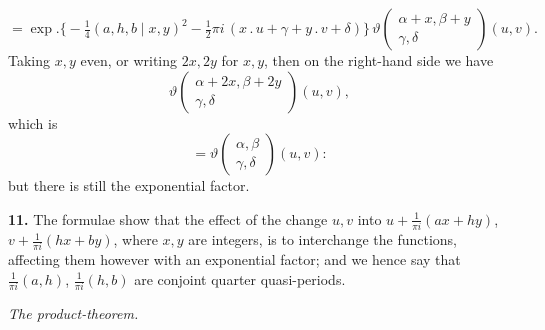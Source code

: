 \documentclass[11pt]{article}
\begin{document}
\[
= \exp.\bigl\{-\tfrac{1}{4}(a,h,b\mid x,y)^2 - \tfrac{1}{2}\pi i\,(x\mathbin{.}u + \gamma + y\mathbin{.}v + \delta)\bigr\}\,\vartheta\!\begin{pmatrix} \alpha + x,\beta + y \\ \gamma,\delta \end{pmatrix}\!(u,v).
\]
Taking $x,y$ even, or writing $2x, 2y$ for $x,y$, then on the right-hand side we have
\[
\vartheta\!\begin{pmatrix} \alpha + 2x,\beta + 2y \\ \gamma,\delta \end{pmatrix}\!(u,v),
\]
which is
\[
= \vartheta\!\begin{pmatrix} \alpha,\beta \\ \gamma,\delta \end{pmatrix}\!(u,v):
\]
but there is still the exponential factor.

\medskip

\textbf{11.} The formulae show that the effect of the change $u,v$ into $u + \tfrac{1}{\pi i}(ax + hy)$, $v + \tfrac{1}{\pi i}(hx + by)$, where $x,y$ are integers, is to interchange the functions, affecting them however with an exponential factor; and we hence say that $\tfrac{1}{\pi i}(a,h)$, $\tfrac{1}{\pi i}(h,b)$ are conjoint quarter quasi-periods.

\medskip

\textit{The product-theorem.}

\medskip
\end{document}
